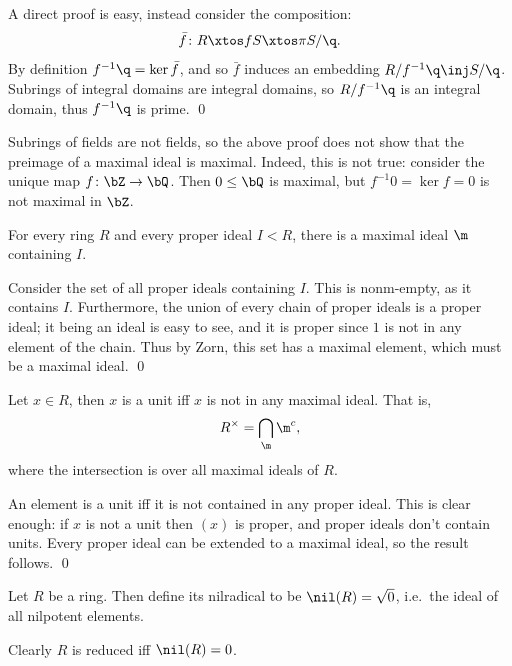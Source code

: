 \elemm

\bproof

    A direct proof is easy, instead consider the composition:
    $$ \bar f\colon R\xtos fS\xtos\pi S/\q . $$
    By definition $f^{-1}\q=\ker\bar f$, and so $\bar f$ induces an embedding $R/f^{-1}\q\inj S/\q$.
    Subrings of integral domains are integral domains, so $R/f^{-1}\q$ is an integral domain, thus $f^{-1}\q$ is prime.
    \qed

\eproof

Subrings of fields are not fields, so the above proof does not show that the preimage of a maximal ideal is maximal.
Indeed, this is not true: consider the unique map $f\colon\bZ\to\bQ$.
Then $0\leq\bQ$ is maximal, but $f^{-1}0=\ker f=0$ is not maximal in $\bZ$.

\bthrm

    For every ring $R$ and every proper ideal $I<R$, there is a maximal ideal $\m$ containing $I$.

\ethrm

\bproof

    Consider the set of all proper ideals containing $I$.
    This is nonm-empty, as it contains $I$.
    Furthermore, the union of every chain of proper ideals is a proper ideal; it being an ideal is easy to see, and it is proper
    since $1$ is not in any element of the chain.
    Thus by Zorn, this set has a maximal element, which must be a maximal ideal.
    \qed

\eproof

\bcoro

    Let $x\in R$, then $x$ is a unit iff $x$ is not in any maximal ideal.
    That is,
    $$ R^\times = \bigcap_\m\m^c , $$
    where the intersection is over all maximal ideals of $R$.

\ecoro

\bproof

    An element is a unit iff it is not contained in any proper ideal.
    This is clear enough: if $x$ is not a unit then $(x)$ is proper, and proper ideals don't contain units.
    Every proper ideal can be extended to a maximal ideal, so the result follows.
    \qed

\eproof

\bdefn

    Let $R$ be a ring.
    Then define its {\emphcolor nilradical} to be $\nil(R)=\sqrt0$, i.e.\ the ideal of all nilpotent elements.

\edefn

Clearly $R$ is reduced iff $\nil(R)=0$.

